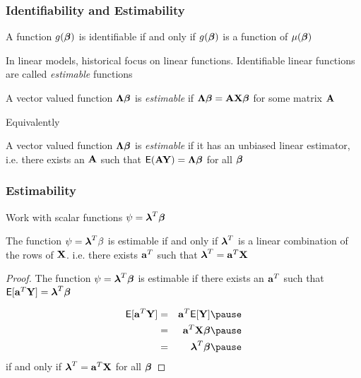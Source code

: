 \documentclass[handout]{beamer}\usepackage[]{graphicx}\usepackage[]{color}
\begin{document}
\begin{frame}
  \frametitle{Identifiability and Estimability}
  \begin{theorem}
    A function $g(\boldsymbol{\beta})$ is identifiable if and only if $g(\boldsymbol{\beta})$ is a
    function of $\mu(\boldsymbol{\beta})$
  \end{theorem} \pause
In linear models,  historical focus on linear functions.  Identifiable linear
functions are called {\it estimable} functions \pause

\begin{definition}
  A vector valued function $\boldsymbol{\Lambda} \boldsymbol{\beta}$ is {\it estimable} if $\boldsymbol{\Lambda} \boldsymbol{\beta}
  = \mathbf{A} \mathbf{X} \boldsymbol{\beta}$ for some matrix $\mathbf{A}$ \pause
\end{definition}
Equivalently

\begin{definition}
  A vector valued function $\boldsymbol{\Lambda} \boldsymbol{\beta}$ is {\it estimable} if it has
  an unbiased linear estimator,   i.e. there exists an $\mathbf{A}$ such that
  $\textsf{E}(\mathbf{A} \mathbf{Y}) = \boldsymbol{\Lambda} \boldsymbol{\beta}$ for all $\boldsymbol{\beta}$
\end{definition}

\end{frame}
\begin{frame}
  \frametitle{Estimability}
  Work with scalar functions $\psi = \boldsymbol{\lambda}^T \boldsymbol{\beta}$
  \begin{theorem}
    The function $\psi = \boldsymbol{\lambda}^T \beta$ is estimable if and only if
    $\boldsymbol{\lambda}^T$ is a linear combination of the rows of
    $\mathbf{X}$. i.e. there exists $\mathbf{a}^T$ such that  $\boldsymbol{\lambda}^T = \mathbf{a}^T \mathbf{X}$
  \end{theorem} \pause
  \begin{proof}
   The function $\psi= \boldsymbol{\lambda}^T\boldsymbol{\beta}$ is estimable if there exists an $\mathbf{a}^T$ such that
    $\textsf{E}[\mathbf{a}^T\mathbf{Y}] = \boldsymbol{\lambda}^T\boldsymbol{\beta}$ \pause

    \begin{eqnarray*}
      \E[\a^T\Y] & =  &\a^T \E[\Y] \pause\\
                 & = & \a^T \X \b \pause \\
  & =& \lambdab^T \b  \pause
    \end{eqnarray*}
if and only if $\boldsymbol{\lambda}^T = \mathbf{a}^T \mathbf{X}$ for all $\boldsymbol{\beta}$
  \end{proof}
\end{frame}
\end{document}
